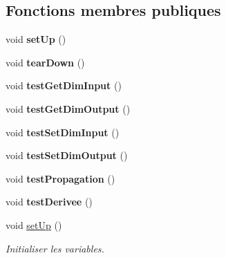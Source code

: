 \subsection*{Fonctions membres publiques}
\begin{DoxyCompactItemize}
\item 
\mbox{\label{classTestCouche_aceb4afd1f69e11bb98a0fb69c5468e85}} 
void {\bfseries set\+Up} ()
\item 
\mbox{\label{classTestCouche_a52d776a6624d1ff323b9c390be482809}} 
void {\bfseries tear\+Down} ()
\item 
\mbox{\label{classTestCouche_a91abe7adddd8687482a86316995d6d2b}} 
void {\bfseries test\+Get\+Dim\+Input} ()
\item 
\mbox{\label{classTestCouche_a9f2a6f3c97c55c920acb3d552a5ccc4d}} 
void {\bfseries test\+Get\+Dim\+Output} ()
\item 
\mbox{\label{classTestCouche_aa192e04275717fab674f977fb24cb59e}} 
void {\bfseries test\+Set\+Dim\+Input} ()
\item 
\mbox{\label{classTestCouche_a6762ad4ef2194ba9990f838d0543c851}} 
void {\bfseries test\+Set\+Dim\+Output} ()
\item 
\mbox{\label{classTestCouche_a2012666426b127d26006dca756986575}} 
void {\bfseries test\+Propagation} ()
\item 
\mbox{\label{classTestCouche_aefdfb41451d5a04fcc3e33704b900315}} 
void {\bfseries test\+Derivee} ()
\item 
\mbox{\label{classTestCouche_aceb4afd1f69e11bb98a0fb69c5468e85}} 
void \hyperlink{classTestCouche_aceb4afd1f69e11bb98a0fb69c5468e85}{set\+Up} ()
\begin{DoxyCompactList}\small\item\em Initialiser les variables. \end{DoxyCompactList}\item 
\mbox{\label{classTestCouche_a52d776a6624d1ff323b9c390be482809}} 

\end{DoxyCompactItemize}
